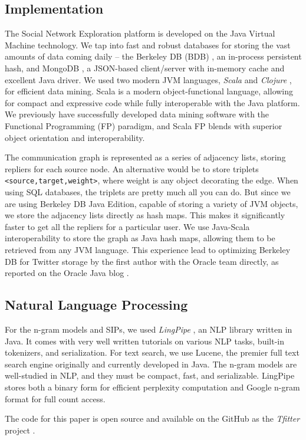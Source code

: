 \subsection{Implementation}

The Social Network Exploration platform is developed on the Java Virtual Machine technology.  We tap into fast and robust databases for storing the vast amounts of data coming daily -- the Berkeley DB (BDB) \cite{code:berkeleydb}, an in-process persistent hash, and MongoDB \cite{code:mongodb}, a JSON-based client/server with in-memory cache and excellent Java driver.  We used two modern JVM languages, \emph{Scala} \cite{code:scala} and \emph{Clojure} \cite{code:clojure}, for efficient data mining.  Scala is a modern object-functional language, allowing for compact and expressive code while fully interoperable with the Java platform.  We previously have successfully developed data mining software with the Functional Programming (FP) paradigm, and Scala FP blends with superior object orientation and interoperability.

The communication graph is represented as a series of adjacency lists, storing repliers for each source node.  An alternative would be to store triplets \verb|<source,target,weight>|, where weight is any object decorating the edge.  When using SQL databases, the triplets are pretty much all you can do.  But since we are using Berkeley DB Java Edition, capable of storing a variety of JVM objects, we store the adjacency lists directly as hash maps.  This makes it significantly faster to get all the repliers for a particular user.  We use Java-Scala interoperability to store the graph as Java hash maps, allowing them to be retrieved from any JVM language.  This experience lead to optimizing Berkeley DB for Twitter storage by the first author with the Oracle team directly, as reported on the Oracle Java blog \cite{OracleBlog:Khrabrov}.

\subsection{Natural Language Processing}

For the n-gram models and SIPs, we used \emph{LingPipe} \cite{code:lingpipe}, an NLP library written in Java.  It comes with very well written tutorials on various NLP tasks, built-in tokenizers, and serialization.  For text search, we use Lucene, the premier full text search engine originally and currently developed in Java.  The n-gram models are well-studied in NLP, and they must be compact, fast, and serializable.  LingPipe stores both a binary form for efficient perplexity computation and Google n-gram format for full count access.

The code for this paper is open source and available on the GitHub as the \emph{Tfitter} project \cite{code:tfitter}.
